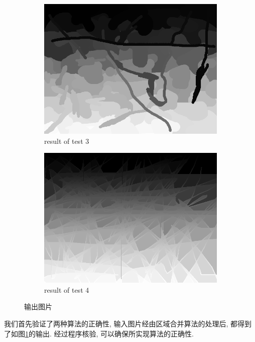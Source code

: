 \documentclass[a4paper, 11pt]{article}
\begin{document}
\begin{figure}[H]
    \begin{subfigure}[b]{0.3\textwidth}
        \centering
        \includegraphics[width=\textwidth]{images/result/3.png}
        \caption{result of test 3}
    \end{subfigure}
    \hspace{5mm}
    \begin{subfigure}[b]{0.3\textwidth}
        \centering
        \includegraphics[width=\textwidth]{images/result/4.png}
         \caption{result of test 4}
    \end{subfigure}
\caption{输出图片}
\label{fig:uf_result}
\end{figure}

我们首先验证了两种算法的正确性, 输入图片经由区域合并算法的处理后, 
都得到了如图\ref{fig:uf_result}的输出. 经过程序核验, 可以确保所实现算法的正确性.
\end{document}
